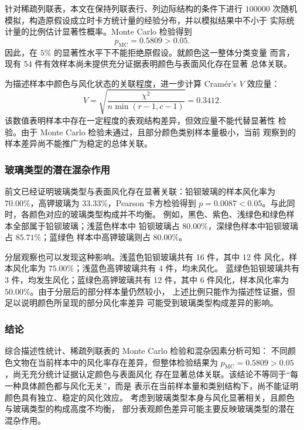 \documentclass[UTF8,a4paper,12pt,fontset=fandol]{ctexart}
\begin{document}
针对稀疏列联表，本文在保持列联表行、列边际结构的条件下进行 $100000$
次随机模拟，构造原假设成立时卡方统计量的经验分布，并以模拟结果中不小于
实际统计量的比例估计显著性概率。Monte Carlo 检验得到
\begin{equation}
    p_{\mathrm{MC}}=0.5809>0.05.
\end{equation}
因此，在 $5\%$ 的显著性水平下不能拒绝原假设。就颜色这一整体分类变量
而言，现有 54 件有效样本尚未提供充分证据表明颜色与表面风化存在显著
总体关联。

为描述样本中颜色与风化状态的关联程度，进一步计算 Cram\'{e}r's $V$
效应量：
\begin{equation}
    V=\sqrt{\frac{\chi^2}{n\min(r-1,c-1)}}=0.3412.
\end{equation}
该数值表明样本中存在一定程度的表观结构差异，但效应量不能代替显著性
检验。由于 Monte Carlo 检验未通过，且部分颜色类别样本量极小，当前
观察到的样本差异尚不能推广为稳定的总体关联。

\subsubsection{玻璃类型的潜在混杂作用}

前文已经证明玻璃类型与表面风化存在显著关联：铅钡玻璃的样本风化率为
$70.00\%$，高钾玻璃为 $33.33\%$，Pearson 卡方检验得到
$p=0.0087<0.05$。与此同时，各颜色对应的玻璃类型构成并不均衡。
例如，黑色、紫色、浅绿色和绿色样本全部属于铅钡玻璃；浅蓝色样本中
铅钡玻璃占 $80.00\%$，深绿色样本中铅钡玻璃占 $85.71\%$；蓝绿色
样本中高钾玻璃则占 $80.00\%$。

分层观察也可以发现这种影响。浅蓝色铅钡玻璃共有 16 件，其中 12 件
风化，样本风化率为 $75.00\%$；浅蓝色高钾玻璃共有 4 件，均未风化。
蓝绿色铅钡玻璃共有 3 件，均发生风化；蓝绿色高钾玻璃共有 12 件，其中
6 件风化，样本风化率为 $50.00\%$。由于分层后的部分样本量仍然较小，
上述比例只能作为描述性证据，但足以说明颜色所呈现的部分风化率差异
可能受到玻璃类型构成差异的影响。

\subsubsection{结论}

综合描述性统计、稀疏列联表的 Monte Carlo 检验和混杂因素分析可知：
不同颜色文物在当前样本中的风化率存在差异，但整体检验结果为
$p_{\mathrm{MC}}=0.5809>0.05$，尚无充分统计证据认定颜色与表面风化
存在显著总体关联。该结论不等同于“每一种具体颜色都与风化无关”，而是
表示在当前样本量和类别结构下，尚不能证明颜色具有独立、稳定的风化效应。
考虑到玻璃类型本身与风化显著相关，且颜色与玻璃类型的构成高度不均衡，
部分表观颜色差异可能主要反映玻璃类型的潜在混杂作用。
\end{document}
